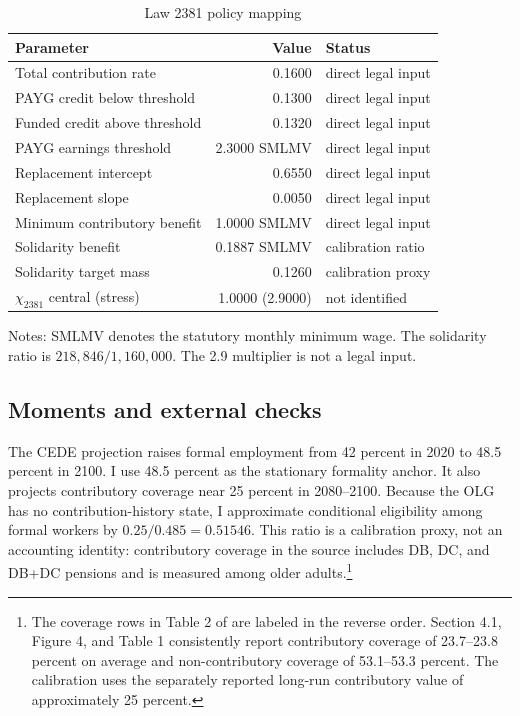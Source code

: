 \documentclass[12pt]{article}
\newcommand{\1}{\mathbf{1}}
\begin{document}
\begin{table}[htbp]\centering
\small
\caption{Law 2381 policy mapping}\label{tab:reformparameters}
\begin{tabular}{lrl}
\toprule Parameter&Value&Status\\ \midrule
Total contribution rate&0.1600&direct legal input\\
PAYG credit below threshold&0.1300&direct legal input\\
Funded credit above threshold&0.1320&direct legal input\\
PAYG earnings threshold&2.3000 SMLMV&direct legal input\\
Replacement intercept&0.6550&direct legal input\\
Replacement slope&0.0050&direct legal input\\
Minimum contributory benefit&1.0000 SMLMV&direct legal input\\
Solidarity benefit&0.1887 SMLMV&calibration ratio\\
Solidarity target mass&0.1260&calibration proxy\\
$\chi_{2381}$ central (stress)&1.0000 (2.9000)&not identified\\ \bottomrule
\end{tabular}
\begin{flushleft}\footnotesize
Notes: SMLMV denotes the statutory monthly minimum wage. The solidarity ratio is
$218{,}846/1{,}160{,}000$. The 2.9 multiplier is not a legal input.
\end{flushleft}
\end{table}


\subsection{Moments and external checks}

The CEDE projection raises formal employment from 42 percent in 2020 to 48.5 percent in
2100. I use 48.5 percent as the stationary formality anchor. It also projects contributory
coverage near 25 percent in 2080--2100. Because the OLG has no contribution-history state, I
approximate conditional eligibility among formal workers by $0.25/0.485=0.51546$. This ratio
is a calibration proxy, not an accounting identity: contributory coverage in the source
includes DB, DC, and DB+DC pensions and is measured among older adults.\footnote{The coverage
rows in Table 2 of \citet{Becerra2025} are labeled in the reverse order. Section 4.1, Figure 4,
and Table 1 consistently report contributory coverage of 23.7--23.8 percent on average and
non-contributory coverage of 53.1--53.3 percent. The calibration uses the separately reported
long-run contributory value of approximately 25 percent.}
\end{document}
